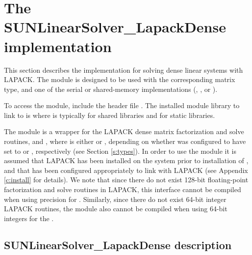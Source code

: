 \section{The SUNLinearSolver\_LapackDense implementation}
\label{ss:sunlinsol_lapdense}

This section describes the {\sunlinsol} implementation for solving dense linear
systems with LAPACK. The {\sunlinsollapdense} module is designed to be used with the
corresponding {\sunmatdense} matrix type, and one of the serial or
shared-memory {\nvector} implementations ({\nvecs}, {\nvecopenmp}, or
{\nvecpthreads}).

To access the {\sunlinsollapdense} module, include the header file \newline
{}. The installed module library to link
to is \newline
{} where 
is typically  for shared libraries and  for static libraries.

The {\sunlinsollapdense} module is a {\sunlinsol} wrapper for
the LAPACK dense matrix factorization and solve routines, 
and , where \id{*} is either  or , depending on
whether {\sundials} was configured to have  set to
 or , respectively (see Section \ref{s:types}).
In order to use the {\sunlinsollapdense} module it is assumed
that LAPACK has been installed on the system prior to installation of
{\sundials}, and that {\sundials} has been configured appropriately to
link with LAPACK (see Appendix \ref{c:install} for details).  
We note that since there do not exist 128-bit floating-point
factorization and solve routines in LAPACK, this interface cannot be
compiled when using  precision for .
Similarly, since there do not exist 64-bit integer LAPACK routines,
the {\sunlinsollapdense} module also cannot be compiled when using
64-bit integers for the . {\warn}


\subsection{SUNLinearSolver\_LapackDense description}
\label{ss:sunlinsol_lapdense_description}

